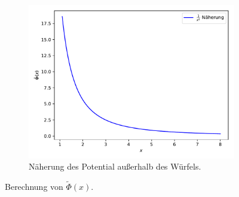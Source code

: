 \begin{figure}
    ~
    \begin{subfigure}[b]{0.45\textwidth}
      \includegraphics[width=\textwidth]{A2/build/ausserhalb_b_fit.pdf}
      \caption{Näherung des Potential außerhalb des Würfels.}
      \label{fig:aus_b_fit}
    \end{subfigure}
    \caption{Berechnung von \(\tilde{\Phi}(x)\).}\label{fig:b}
\end{figure}
